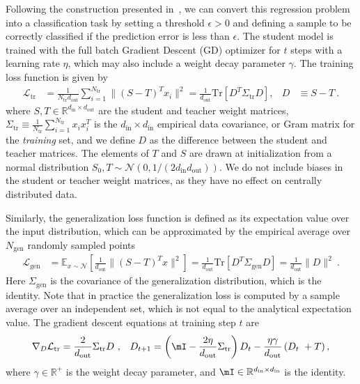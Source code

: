 \documentclass[a4paper,11pt]{article}
\def\tr{\textrm{Tr}}
\newcommand{\alonb}[1]{}
\newcommand{\loss}{\mathcal{L}}
\newcommand{\norm}[1]{\| #1 \|}
\newcommand{\dout}{d_\mathrm{out}}
\newcommand{\din}{d_\mathrm{in}}
\newcommand{\training}{\mathrm{tr}}
\newcommand{\gen}{\mathrm{gen}}
\begin{document}
Following the construction presented in~\cite{liu2023omnigrok}, we can convert this regression problem into a classification task by setting a threshold $\epsilon>0$ and defining a sample to be correctly classified if the prediction error is less than $\epsilon$.
%
The student model is trained with the full batch Gradient Descent (GD) optimizer for $t$ steps with a learning rate $\eta$, which may also include a weight decay parameter $\gamma$. 
%
The training loss function is given by\alonb{ add $=\frac{1}{d_{\mathrm{out}}}\norm{D}_{\Sigma_{\mathrm{tr}}}$?}
\begin{align}
\label{eq:linear_loss}
    \mathcal{L}_\training 
    &= 
    \frac{1}{N_\training \dout}
    \sum_{i=1}^{N_\training }
    \norm{ 
    (S  - T)^T x_i
    }^2 
    =
    \frac{1}{\dout}
    \tr
    \left[
    D^T \Sigma_\training D 
    \right]
    ,
    & 
    D&\equiv S-T
    \ .
\end{align}
where $S,T \in \mathbb{R}^{\din\times \dout}$ are the student and teacher weight matrices, $\Sigma_\training \equiv \frac{1}{N_\training}  \sum_{i=1}^{N_\training} x_ix^T_i$ is the $d_{\mathrm{in}} \times d_{\mathrm{in}}$ empirical data covariance, or Gram matrix for the {\it training} set, and we define $D$ as the difference between the student and teacher matrices.  The elements of $T$ and $S$ are drawn at initialization from a normal distribution $S_0, T \sim \mathcal{N}(0,1/({2 \din }\dout))$. We do not include biases in the student or teacher weight matrices, as they have no effect on centrally distributed data.






Similarly, the generalization loss function is defined as its expectation value over the input distribution, which can be approximated by the empirical average over $N_\gen$ randomly sampled points\alonb{and here $=\frac{1}{d_{\mathrm{out}}}\norm{D}_{\Sigma_{\mathrm{gen}}}$?}
\begin{align}
    \mathcal{L}_\gen 
    &= \mathbb{E}_{x\sim\mathcal{N}}\left[
    \frac{1}{\dout}
    \norm{ 
    (S  - T)^T x
    }^2\right]
    =\frac{1}{\dout}
    \tr\left[ 
    D^T \Sigma_\gen D 
    \right]
    = \frac{1}{\dout}\norm{D}^2 
    \ .
    \label{eq:generalization_linear_loss}
\end{align}
Here $\Sigma_\gen$ is the covariance of the generalization distribution, which is the identity. Note that in practice the generalization loss is computed by a sample average over an independent set, which is not equal to the analytical expectation value. 
%
The gradient descent equations at training step $t$ are \alonb{What does the left equation contribute?}
\begin{align}
\label{eq:GD}
    \nabla_D \loss_\training&=\frac{2}{\dout}\Sigma_\training D\ ,
    &
    {D}_{t+1}
    =
     \left( \mI  - \frac{2\eta}{d_\mathrm{out}} \Sigma_\training  \right) D_t
     - \frac{\eta \gamma}{\dout} \left(D_t\ +T\right) ,
\end{align}
where $\gamma \in \mathbb{R}^+$ is the weight decay parameter, and $\mI \in \mathbb{R}^{\din \times \din}$ is the identity.
\end{document}
